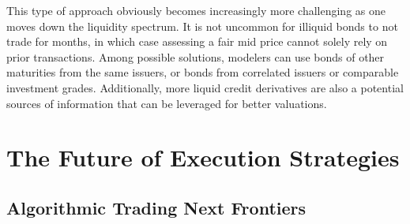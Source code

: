 This type of approach obviously becomes increasingly more challenging as one moves down the liquidity spectrum. It is not uncommon for illiquid bonds to not trade for months, in which case assessing a fair mid price cannot solely rely on prior transactions. Among possible solutions, modelers can use bonds of other maturities from the same issuers, or bonds from correlated issuers or comparable investment grades. Additionally, more liquid credit derivatives are also a potential sources of information that can be leveraged for better valuations. 



\section{The Future of Execution Strategies}
\subsection{Algorithmic Trading Next Frontiers}


